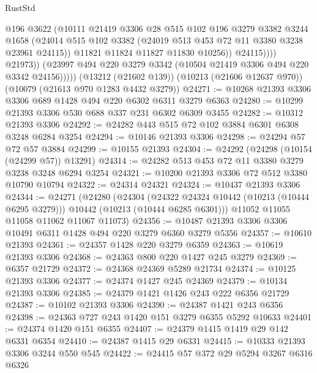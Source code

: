 \begin{lexlean}{RustStd}
\begin{coremodule}
{\begin{coremodule}
{{{{{{{{{{{{{{{{{{{{{{{{{{                        @196
                        @3622
                        (@10111
                          @21419
                          @3306
                          @28
                          @515
                          @102
                          @196
                          @3279
                          @3382
                          @3244
                          @1658
                          (@24014
                            @515
                            @102
                            @3382
                            (@24019 @513 @453 @72 @11 @3380 @3238 @23961 @24115))
                          @11821
                          @11824
                          @11827
                          @11830
                          @10256))
                      @24115))))
              @21973))
          (@23997 @494 @220 @3279 @3342 (@10504 @21419 @3306 @494 @220 @3342 @24156)))))
    (@13212 (@21602 @139))
    (@10213 (@21606 @12637 @970))
    (@10079 (@21613 @970 @1283 @4432 @3279))
@24271 := @10268 @21393 @3306 @3306 @689 @1428 @494 @220 @6302 @6311 @3279 @6363
@24280 := @10299 @21393 @3306 @530 @688 @337 @231 @6302 @6309 @3455
@24282 := @10312 @21393 @3306
@24292 := @24282 @443 @515 @72 @102 @3884 @6301 @6308 @3248 @6284 @3254
@24294 := @10146 @21393 @3306
@24298 := @24294 @57 @72 @57 @3884
@24299 := @10155 @21393
@24304 := @24292 (@24298 (@10154 (@24299 @57)) @13291)
@24314 := @24282 @513 @453 @72 @11 @3380 @3279 @3238 @3248 @6294 @3254
@24321 := @10200 @21393 @3306 @72 @512 @3380 @10790 @10794
@24322 := @24314 @24321
@24324 := @10437 @21393 @3306
@24344 := @24271
    (@24280
      (@24304
        (@24322 @24324 @10442 (@10213 (@10444 @6295 @3279)))
        @10442
        (@10213 (@10444 @6285 @6301)))
      @11052
      @11055
      @11058
      @11062
      @11067
      @11073)
@24356 := @10487 @21393 @3306 @3306 @10491 @6311 @1428 @494 @220 @3279 @6360 @3279 @5356
@24357 := @10610 @21393
@24361 := @24357 @1428 @220 @3279 @6359
@24363 := @10619 @21393 @3306
@24368 := @24363 @800 @220 @1427 @245 @3279
@24369 := @6357 @21729
@24372 := @24368 @24369 @5289 @21734
@24374 := @10125 @21393 @3306
@24377 := @24374 @1427 @245 @24369
@24379 := @10134 @21393 @3306
@24385 := @24379 @1421 @1426 @243 @222 @6356 @21729
@24387 := @10102 @21393 @3306
@24390 := @24387 @1421 @243 @6356
@24398 := @24363 @727 @243 @1420 @151 @3279 @6355 @5292 @10633
@24401 := @24374 @1420 @151 @6355
@24407 := @24379 @1415 @1419 @29 @142 @6331 @6354
@24410 := @24387 @1415 @29 @6331
@24415 := @10333 @21393 @3306 @3244 @550 @545
@24422 := @24415 @57 @372 @29 @5294 @3267 @6316 @6326
}}}}}}}}}}}}}}}}}}}}}}}}}}
\end{coremodule}}
\end{coremodule}
\end{lexlean}
